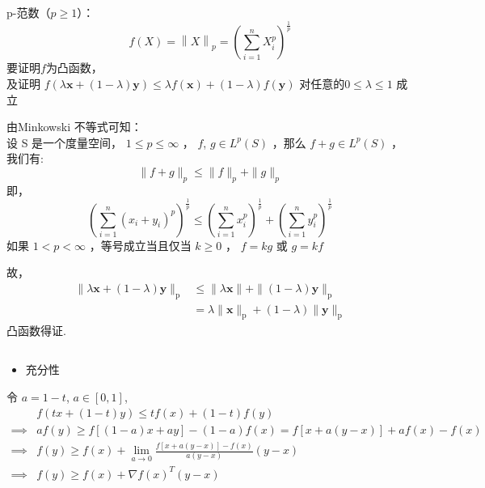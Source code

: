 \documentclass[UTF8,a4paper,AutoFakeBold,AutoFakeSlant]{article}
\begin{document}
\subsection{}
p-范数（$p \geq 1$）：
\begin{equation*}
  f(X) = \left\lVert X\right\rVert_p  = (\sum_{i=1}^{n}X_i^p)^{\frac{1}{p}}
\end{equation*}
要证明$f$为凸函数，\\
及证明 $f(\lambda \mathbf{x}+(1-\lambda) \mathbf{y}) \leq \lambda f(\mathbf{x})+(1-\lambda) f(\mathbf{y})$ 对任意的$ 0 \leq \lambda \leq 1 $ 成立

由Minkowski 不等式可知：\\
设  S  是一个度量空间，  $1 \leq p \leq \infty$ ， $f$, $g \in L^{p}(S)$  ，那么  $f+g \in L^{p}(S)$  ，我们有:
\begin{equation*}
  \|f+g\|_{p} \leq\|f\|_{p}+\|g\|_{p}
\end{equation*}
即，
\begin{equation*}
  \left(\sum_{i=1}^{n}\left(x_{i}+y_{i}\right)^{p}\right)^{\frac{1}{p}} \leq\left(\sum_{i=1}^{n} x_{i}^{p}\right)^{\frac{1}{p}}+\left(\sum_{i=1}^{n} y_{i}^{p}\right)^{\frac{1}{p}}
\end{equation*}
如果  $1<p<\infty$  ，等号成立当且仅当 $ k \geq 0$ ， $f=k g$  或  $g=k f $

故，
\begin{equation*}
  \begin{aligned}
    \|\lambda \mathbf{x}+(1-\lambda) \mathbf{y}\|_{\mathrm{p}} & \leq\|\lambda \mathbf{x}\|+\|(1-\lambda) \mathbf{y}\|_{\mathrm{p}}         \\
                                                               & =\lambda\|\mathbf{x}\|_{\mathrm{p}}+(1-\lambda)\|\mathbf{y}\|_{\mathrm{p}}
  \end{aligned}
\end{equation*}
凸函数得证.


\subsection{}
\begin{itemize}
  \item 充分性
\end{itemize}

令 $ a = 1-t $, $ a \in \left[0, 1\right]  $,
\begin{equation*}
  \begin{aligned}
             & f(t x+(1-t) y) \leq t f(x)+(1-t) f(y)                                       \\
    \implies & a f(y) \geq f[(1-a) x+a y]-(1-a) f(x)=f[x+a(y-x)]+a f(x)-f(x)               \\
    \implies & f(y) \geq f(x)+\lim _{a \rightarrow 0} \frac{f[x+a(y-x)]-f(x)}{a(y-x)}(y-x) \\
    \implies & f(y) \geq f(x)+\nabla f(x)^{T}(y-x)
  \end{aligned}
\end{equation*}
\end{document}
